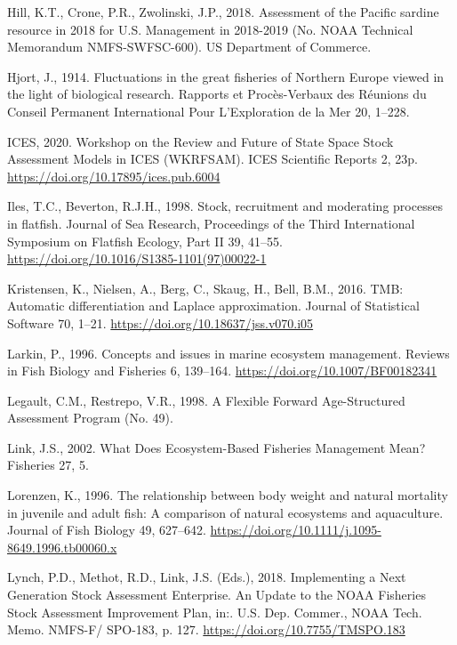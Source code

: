 \documentclass[]{article}
\begin{document}
\leavevmode\hypertarget{ref-hill2018Assessment}{}%
Hill, K.T., Crone, P.R., Zwolinski, J.P., 2018. Assessment of the
Pacific sardine resource in 2018 for U.S. Management in 2018-2019 (No.
NOAA Technical Memorandum NMFS-SWFSC-600). US Department of Commerce.

\leavevmode\hypertarget{ref-hjort1914Fluctuations}{}%
Hjort, J., 1914. Fluctuations in the great fisheries of Northern Europe
viewed in the light of biological research. Rapports et Procès-Verbaux
des Réunions du Conseil Permanent International Pour L'Exploration de la
Mer 20, 1--228.

\leavevmode\hypertarget{ref-ices2020Workshop}{}%
ICES, 2020. Workshop on the Review and Future of State Space Stock
Assessment Models in ICES (WKRFSAM). ICES Scientific Reports 2, 23p.
\url{https://doi.org/10.17895/ices.pub.6004}

\leavevmode\hypertarget{ref-iles1998Stock}{}%
Iles, T.C., Beverton, R.J.H., 1998. Stock, recruitment and moderating
processes in flatfish. Journal of Sea Research, Proceedings of the Third
International Symposium on Flatfish Ecology, Part II 39, 41--55.
\url{https://doi.org/10.1016/S1385-1101(97)00022-1}

\leavevmode\hypertarget{ref-kristensen2016TMB}{}%
Kristensen, K., Nielsen, A., Berg, C., Skaug, H., Bell, B.M., 2016. TMB:
Automatic differentiation and Laplace approximation. Journal of
Statistical Software 70, 1--21.
\url{https://doi.org/10.18637/jss.v070.i05}

\leavevmode\hypertarget{ref-larkin1996Concepts}{}%
Larkin, P., 1996. Concepts and issues in marine ecosystem management.
Reviews in Fish Biology and Fisheries 6, 139--164.
\url{https://doi.org/10.1007/BF00182341}

\leavevmode\hypertarget{ref-legault1998Flexible}{}%
Legault, C.M., Restrepo, V.R., 1998. A Flexible Forward Age-Structured
Assessment Program (No. 49).

\leavevmode\hypertarget{ref-link2002What}{}%
Link, J.S., 2002. What Does Ecosystem-Based Fisheries Management Mean?
Fisheries 27, 5.

\leavevmode\hypertarget{ref-lorenzen1996Relationship}{}%
Lorenzen, K., 1996. The relationship between body weight and natural
mortality in juvenile and adult fish: A comparison of natural ecosystems
and aquaculture. Journal of Fish Biology 49, 627--642.
\url{https://doi.org/10.1111/j.1095-8649.1996.tb00060.x}

\leavevmode\hypertarget{ref-lynch2018Implementing}{}%
Lynch, P.D., Methot, R.D., Link, J.S. (Eds.), 2018. Implementing a Next
Generation Stock Assessment Enterprise. An Update to the NOAA Fisheries
Stock Assessment Improvement Plan, in:. U.S. Dep. Commer., NOAA Tech.
Memo. NMFS-F/ SPO-183, p. 127. \url{https://doi.org/10.7755/TMSPO.183}
\end{document}
